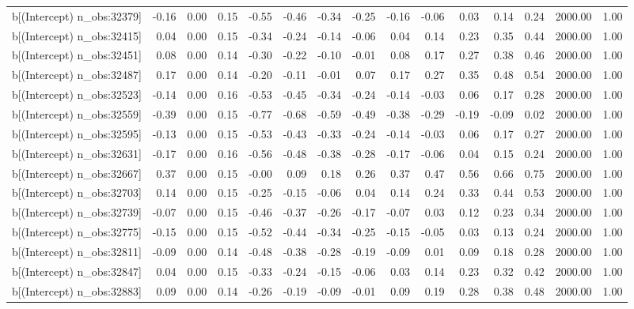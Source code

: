 \begin{table}[ht]
\begin{tabular}{rrrrrrrrrrrrrrr}
  b[(Intercept) n\_obs:32379] & -0.16 & 0.00 & 0.15 & -0.55 & -0.46 & -0.34 & -0.25 & -0.16 & -0.06 & 0.03 & 0.14 & 0.24 & 2000.00 & 1.00 \\ 
  b[(Intercept) n\_obs:32415] & 0.04 & 0.00 & 0.15 & -0.34 & -0.24 & -0.14 & -0.06 & 0.04 & 0.14 & 0.23 & 0.35 & 0.44 & 2000.00 & 1.00 \\ 
  b[(Intercept) n\_obs:32451] & 0.08 & 0.00 & 0.14 & -0.30 & -0.22 & -0.10 & -0.01 & 0.08 & 0.17 & 0.27 & 0.38 & 0.46 & 2000.00 & 1.00 \\ 
  b[(Intercept) n\_obs:32487] & 0.17 & 0.00 & 0.14 & -0.20 & -0.11 & -0.01 & 0.07 & 0.17 & 0.27 & 0.35 & 0.48 & 0.54 & 2000.00 & 1.00 \\ 
  b[(Intercept) n\_obs:32523] & -0.14 & 0.00 & 0.16 & -0.53 & -0.45 & -0.34 & -0.24 & -0.14 & -0.03 & 0.06 & 0.17 & 0.28 & 2000.00 & 1.00 \\ 
  b[(Intercept) n\_obs:32559] & -0.39 & 0.00 & 0.15 & -0.77 & -0.68 & -0.59 & -0.49 & -0.38 & -0.29 & -0.19 & -0.09 & 0.02 & 2000.00 & 1.00 \\ 
  b[(Intercept) n\_obs:32595] & -0.13 & 0.00 & 0.15 & -0.53 & -0.43 & -0.33 & -0.24 & -0.14 & -0.03 & 0.06 & 0.17 & 0.27 & 2000.00 & 1.00 \\ 
  b[(Intercept) n\_obs:32631] & -0.17 & 0.00 & 0.16 & -0.56 & -0.48 & -0.38 & -0.28 & -0.17 & -0.06 & 0.04 & 0.15 & 0.24 & 2000.00 & 1.00 \\ 
  b[(Intercept) n\_obs:32667] & 0.37 & 0.00 & 0.15 & -0.00 & 0.09 & 0.18 & 0.26 & 0.37 & 0.47 & 0.56 & 0.66 & 0.75 & 2000.00 & 1.00 \\ 
  b[(Intercept) n\_obs:32703] & 0.14 & 0.00 & 0.15 & -0.25 & -0.15 & -0.06 & 0.04 & 0.14 & 0.24 & 0.33 & 0.44 & 0.53 & 2000.00 & 1.00 \\ 
  b[(Intercept) n\_obs:32739] & -0.07 & 0.00 & 0.15 & -0.46 & -0.37 & -0.26 & -0.17 & -0.07 & 0.03 & 0.12 & 0.23 & 0.34 & 2000.00 & 1.00 \\ 
  b[(Intercept) n\_obs:32775] & -0.15 & 0.00 & 0.15 & -0.52 & -0.44 & -0.34 & -0.25 & -0.15 & -0.05 & 0.03 & 0.13 & 0.24 & 2000.00 & 1.00 \\ 
  b[(Intercept) n\_obs:32811] & -0.09 & 0.00 & 0.14 & -0.48 & -0.38 & -0.28 & -0.19 & -0.09 & 0.01 & 0.09 & 0.18 & 0.28 & 2000.00 & 1.00 \\ 
  b[(Intercept) n\_obs:32847] & 0.04 & 0.00 & 0.15 & -0.33 & -0.24 & -0.15 & -0.06 & 0.03 & 0.14 & 0.23 & 0.32 & 0.42 & 2000.00 & 1.00 \\ 
  b[(Intercept) n\_obs:32883] & 0.09 & 0.00 & 0.14 & -0.26 & -0.19 & -0.09 & -0.01 & 0.09 & 0.19 & 0.28 & 0.38 & 0.48 & 2000.00 & 1.00 \\ 

\end{tabular}
\end{table}

